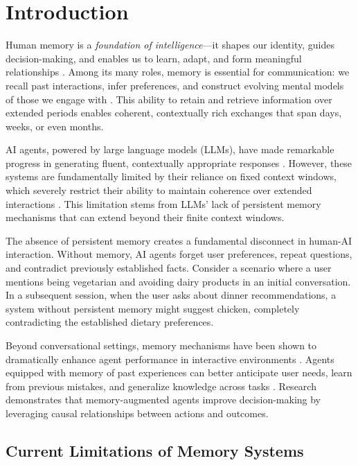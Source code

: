 \section{Introduction}
\label{sec:intro}

Human memory is a \emph{foundation of intelligence}---it shapes our identity, guides decision-making, and enables us to learn, adapt, and form meaningful relationships \citep{craik1992human}. Among its many roles, memory is essential for communication: we recall past interactions, infer preferences, and construct evolving mental models of those we engage with \citep{assmann2011communicative}. This ability to retain and retrieve information over extended periods enables coherent, contextually rich exchanges that span days, weeks, or even months.

AI agents, powered by large language models (LLMs), have made remarkable progress in generating fluent, contextually appropriate responses \citep{yu2024finmem, zhang2024survey}. However, these systems are fundamentally limited by their reliance on fixed context windows, which severely restrict their ability to maintain coherence over extended interactions \citep{bulatov2022recurrent, liu2023think}. This limitation stems from LLMs' lack of persistent memory mechanisms that can extend beyond their finite context windows.

The absence of persistent memory creates a fundamental disconnect in human-AI interaction. Without memory, AI agents forget user preferences, repeat questions, and contradict previously established facts. Consider a scenario where a user mentions being vegetarian and avoiding dairy products in an initial conversation. In a subsequent session, when the user asks about dinner recommendations, a system without persistent memory might suggest chicken, completely contradicting the established dietary preferences.

Beyond conversational settings, memory mechanisms have been shown to dramatically enhance agent performance in interactive environments \citep{majumderclin, shinn2023reflexion}. Agents equipped with memory of past experiences can better anticipate user needs, learn from previous mistakes, and generalize knowledge across tasks \citep{chhikara2023knowledge}. Research demonstrates that memory-augmented agents improve decision-making by leveraging causal relationships between actions and outcomes.

\subsection{Current Limitations of Memory Systems}

